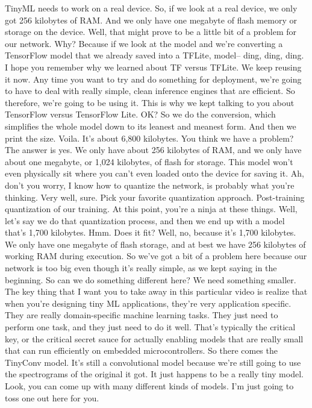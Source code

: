 TinyML needs to work on a real device.
So, if we look at a real device, we only got 256 kilobytes of RAM.
And we only have one megabyte of flash memory or storage on the device.
Well, that might prove to be a little bit of a problem for our network.
Why?
Because if we look at the model and we're
converting a TensorFlow model that we already saved into a TFLite, model--
ding, ding, ding.
I hope you remember why we learned about TF versus TFLite.
We keep reusing it now.
Any time you want to try and do something for deployment,
we're going to have to deal with really simple, clean inference engines that
are efficient.
So therefore, we're going to be using it.
This is why we kept talking to you about TensorFlow versus TensorFlow Lite.
OK?
So we do the conversion, which simplifies the whole model down
to its leanest and meanest form.
And then we print the size.
Voila.
It's about 6,800 kilobytes.
You think we have a problem?
The answer is yes.
We only have about 256 kilobytes of RAM, and we only
have about one megabyte, or 1,024 kilobytes, of flash for storage.
This model won't even physically sit where you can't even
loaded onto the device for saving it.
Ah, don't you worry, I know how to quantize the network,
is probably what you're thinking.
Very well, sure.
Pick your favorite quantization approach.
Post-training quantization of our training.
At this point, you're a ninja at these things.
Well, let's say we do that quantization process,
and then we end up with a model that's 1,700 kilobytes.
Hmm.
Does it fit?
Well, no, because it's 1,700 kilobytes.
We only have one megabyte of flash storage,
and at best we have 256 kilobytes of working RAM during execution.
So we've got a bit of a problem here because our network
is too big even though it's really simple, as we
kept saying in the beginning.
So can we do something different here?
We need something smaller.
The key thing that I want you to take away in this particular video
is realize that when you're designing tiny ML applications,
they're very application specific.
They are really domain-specific machine learning tasks.
They just need to perform one task, and they just need to do it well.
That's typically the critical key, or the critical secret sauce
for actually enabling models that are really small
that can run efficiently on embedded microcontrollers.
So there comes the TinyConv model.
It's still a convolutional model because we're still
going to use the spectrograms of the original it got.
It just happens to be a really tiny model.
Look, you can come up with many different kinds of models.
I'm just going to toss one out here for you.
